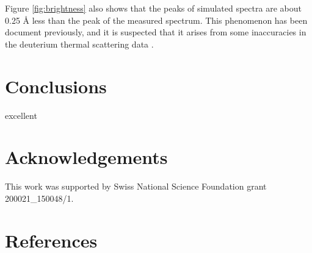 \documentclass[5p,12pt]{elsarticle}
\begin{document}
Figure \ref{fig:brightness} also shows that the peaks of simulated spectra are about 0.25 {\AA} less than the peak of the measured spectrum.  This phenomenon has been document previously, and it is suspected that it arises from some inaccuracies in the deuterium thermal scattering data \cite{giller_thesis}.

%
%
%
%
%

\section{Conclusions}
\label{sec:conclusions}

excellent

%
%
%
%
%

\section*{Acknowledgements}
\label{sec:ack}

This work was supported by Swiss National Science Foundation grant 200021\_150048/1.

%
%
%
%
%

\section*{References}


\end{document}
